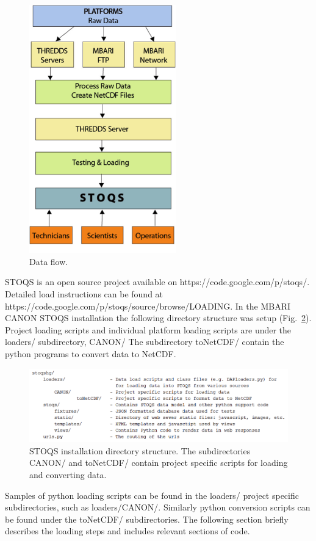 \begin{figure}[htbp]
\centering
\includegraphics[width=2.5in]{ReikoFigure2.png}
\caption{Data flow.}
\label{fig:ReikoFigure2}
\end{figure}

STOQS is an open source project available on https://code.google.com/p/stoqs/.  Detailed load instructions can be found at https://code.google.com/p/stoqs/source/browse/LOADING.  In the MBARI CANON STOQS installation the following directory structure was setup (Fig.~\ref{fig:ReikoFigure3}).  Project loading scripts and individual platform loading scripts are under the loaders/ subdirectory,  CANON/ The subdirectory toNetCDF/ contain the python programs to convert data to NetCDF.  

\begin{figure}[htbp]
\centering
\includegraphics[width=5.0in]{ReikoFigure3.png}
\caption{STOQS installation directory structure. The subdirectories CANON/ and toNetCDF/ contain project specific  scripts for loading and converting data.}
\label{fig:ReikoFigure3}
\end{figure}

Samples of python loading scripts can be found in the loaders/ project specific subdirectories, such as loaders/CANON/. Similarly python conversion scripts can be found under the toNetCDF/ subdirectories.  The following section briefly describes the loading steps and includes relevant sections of code. 

